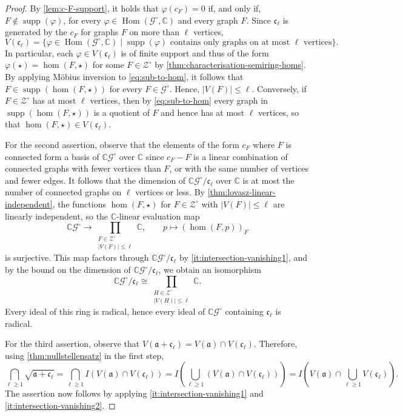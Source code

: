 \documentclass[11pt]{scrartcl}
\theoremstyle{definition}
\theoremstyle{plain}
\theoremstyle{remark}
\renewcommand\phi\varphi
\DeclareMathOperator\Hom{Hom}
\DeclareMathOperator{\supp}{supp}
\newcommand{\lG}{\mathcal{G}^\circ}
\newcommand{\lZ}{\mathcal{Z}^\circ}
\newcommand{\C}{\mathbb{C}}
\begin{document}
	\begin{proof}
		By \cref{lem:c-F-support}, it holds that $\phi(c_F) = 0$ if, and only if, $F \notin \supp(\phi)$,
		for every $\phi \in \Hom(\lG, \mathbb{C})$ and every graph $F$.
		Since $\mathfrak{c}_\ell$ is generated by the $c_F$ for graphs $F$ on more than $\ell$ vertices,
		\[
			V(\mathfrak{c}_\ell) = \{\phi \in \Hom(\lG, \mathbb{C}) \mid \supp(\phi) \text{ contains only graphs on at most } \ell \text{ vertices}\}.
		\]
        In particular, each $\phi \in V(\mathfrak{c}_\ell)$ is of finite support
        and thus of the form $\phi(\star) = \hom(F, \star)$ for some $F \in \lZ$ by \cref{thm:characterisation-semiring-homs}.
        By applying M\"obius inversion to \cref{eq:sub-to-hom},
        it follows that $F \in \supp(\hom(F, \star))$ for every $F \in \lG$.
        Hence, $|V(F)| \leq \ell$.
        Conversely, if $F \in \lZ$ has at most $\ell$ vertices,
        then by \cref{eq:sub-to-hom} every graph in $\supp(\hom(F, \star))$ is a quotient of $F$
        and hence has at most $\ell$ vertices, so that $\hom(F, \star) \in V(\mathfrak{c}_\ell)$.

        For the second assertion, observe that the elements of the form $c_F$ where $F$ is connected form a basis of $\C\lG$ over $\C$ since $c_F - F$ is a linear combination of connected graphs with fewer vertices than $F$, or with the same number of vertices and fewer edges. It follows that the dimension of $\C\lG/\mathfrak{c}_\ell$ over $\C$ is at most the	number of connected graphs on $\ell$ vertices or less. By \cref{thm:lovasz-linear-independent}, the functions $\hom(F, \star)$ for $F \in \lZ$ with $|V(F)| \leq \ell$ are linearly independent, so the $\C$-linear evaluation map
		\[ 
		\C\lG \longrightarrow \prod_{\substack{F\in\lZ\\|V(F)|\leq\ell}}\C,
		\qquad
		p \longmapsto (\hom(F,p))_F
		\]
		is surjective. This map factors through $\C\lG/\mathfrak{c}_\ell$ by \cref{it:intersection-vanishing1}, and by the bound on the dimension of $\C\lG/\mathfrak{c}_\ell$, we obtain an isomorphism
		\[
		\C\lG/\mathfrak{c}_\ell
		\cong
		\prod_{\substack{H\in\lZ\\ |V(H)|\leq\ell}}\C.
		\]
		Every ideal of this ring is radical, hence every ideal of $\C\lG$ containing $\mathfrak{c}_\ell$ is radical.
        
        For the third assertion, observe that $V(\mathfrak{a} + \mathfrak{c}_\ell) = V(\mathfrak{a}) \cap V(\mathfrak{c}_\ell)$.
		Therefore, using \cref{thm:nullstellensatz} in the first step,
		\[
			\bigcap_{\ell \geq 1} \sqrt{\mathfrak{a} + \mathfrak{c}_\ell}
			= \bigcap_{\ell \geq 1} I\left(V(\mathfrak{a}) \cap V(\mathfrak{c}_\ell)\right)
			= I\left(\bigcup_{\ell \geq 1} \left(V(\mathfrak{a}) \cap V(\mathfrak{c}_\ell)\right)\right)
            = I\left(V(\mathfrak{a}) \cap \bigcup_{\ell \geq 1} V(\mathfrak{c}_\ell)\right).
		\]
        The assertion now follows by applying \cref{it:intersection-vanishing1} and \cref{it:intersection-vanishing2}.
	\end{proof}
\end{document}
